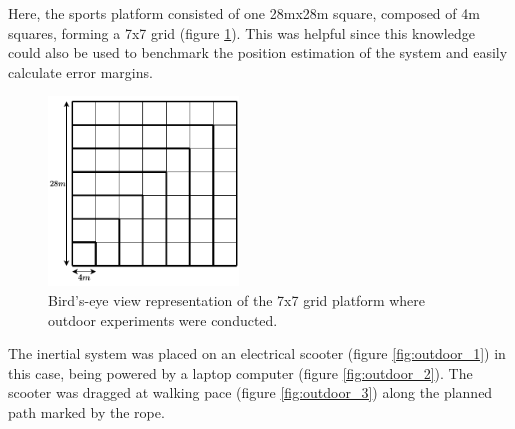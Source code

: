 Here, the sports platform consisted of one 28mx28m square, composed of 4m squares, forming a 7x7 grid (figure \ref{fig:platform_representation}). This was helpful since this knowledge could also be used to benchmark the position estimation of the system and easily calculate error margins.

\begin{figure}[!h]
  \centering
  \includegraphics[width=0.45\textwidth]{figures/square.pdf}
  \caption{ Bird's-eye view representation of the 7x7 grid platform where outdoor experiments were conducted. }
  \label{fig:platform_representation}
\end{figure}





The inertial system was placed on an electrical scooter (figure \ref{fig:outdoor_1}) in this case, being powered by a laptop computer (figure \ref{fig:outdoor_2}). The scooter was dragged at walking pace (figure \ref{fig:outdoor_3}) along the planned path marked by the rope.

